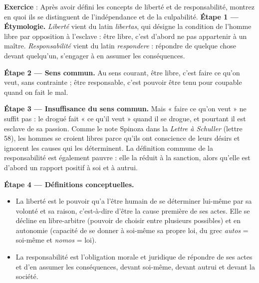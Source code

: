 \documentclass[11pt]{article}
\newcommand{\cle}[1]{{\popxbold\color{popdark}#1}}
\begin{document}
\begin{exoresolu}
\textbf{Exercice} : Après avoir défini les concepts de liberté et de responsabilité, montrez en quoi ils se distinguent de l'indépendance et de la culpabilité.
\tcblower
\textbf{Étape 1 — Étymologie.} \emph{Liberté} vient du latin \emph{libertas}, qui désigne la condition de l'homme libre par opposition à l'esclave : être libre, c'est d'abord ne pas appartenir à un maître. \emph{Responsabilité} vient du latin \emph{respondere} : répondre de quelque chose devant quelqu'un, s'engager à en assumer les conséquences.

\textbf{Étape 2 — Sens commun.} Au sens courant, être libre, c'est faire ce qu'on veut, sans contrainte ; être responsable, c'est pouvoir être tenu pour coupable quand on fait le mal.

\textbf{Étape 3 — Insuffisance du sens commun.} Mais « faire ce qu'on veut » ne suffit pas : le drogué fait « ce qu'il veut » quand il se drogue, et pourtant il est esclave de sa passion. Comme le note Spinoza dans la \emph{Lettre à Schuller} (lettre 58), les hommes se croient libres parce qu'ils ont conscience de leurs désirs et ignorent les causes qui les déterminent. La définition commune de la responsabilité est également pauvre : elle la réduit à la sanction, alors qu'elle est d'abord un rapport positif à soi et à autrui.

\textbf{Étape 4 — Définitions conceptuelles.}
\begin{itemize}
\item La \cle{liberté} est le pouvoir qu'a l'être humain de se déterminer lui-même par sa volonté et sa raison, c'est-à-dire d'être la cause première de ses actes. Elle se décline en \cle{libre-arbitre} (pouvoir de choisir entre plusieurs possibles) et en \cle{autonomie} (capacité de se donner à soi-même sa propre loi, du grec \emph{autos} = soi-même et \emph{nomos} = loi).
\item La \cle{responsabilité} est l'obligation morale et juridique de répondre de ses actes et d'en assumer les conséquences, devant soi-même, devant autrui et devant la société.
\end{itemize}


\end{exoresolu}
\end{document}

